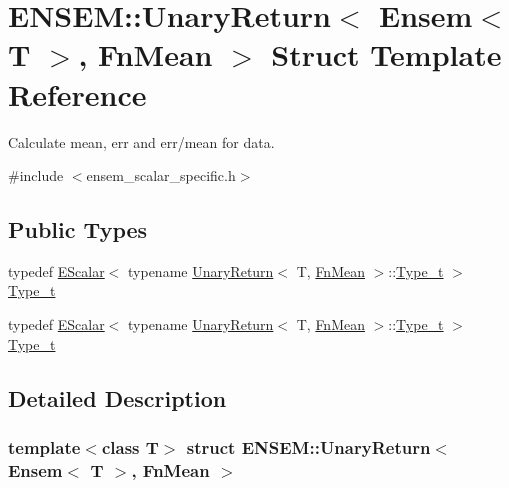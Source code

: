 \hypertarget{structENSEM_1_1UnaryReturn_3_01Ensem_3_01T_01_4_00_01FnMean_01_4}{}\section{E\+N\+S\+EM\+:\+:Unary\+Return$<$ Ensem$<$ T $>$, Fn\+Mean $>$ Struct Template Reference}
\label{structENSEM_1_1UnaryReturn_3_01Ensem_3_01T_01_4_00_01FnMean_01_4}


Calculate mean, err and err/mean for data.  




{\ttfamily \#include $<$ensem\+\_\+scalar\+\_\+specific.\+h$>$}

\subsection*{Public Types}
\begin{DoxyCompactItemize}
\item 
typedef \mbox{\hyperlink{classENSEM_1_1EScalar}{E\+Scalar}}$<$ typename \mbox{\hyperlink{structENSEM_1_1UnaryReturn}{Unary\+Return}}$<$ T, \mbox{\hyperlink{structENSEM_1_1FnMean}{Fn\+Mean}} $>$\+::\mbox{\hyperlink{structENSEM_1_1UnaryReturn_3_01Ensem_3_01T_01_4_00_01FnMean_01_4_aecb00ba039f774eb3f7e9c0d788867a6}{Type\+\_\+t}} $>$ \mbox{\hyperlink{structENSEM_1_1UnaryReturn_3_01Ensem_3_01T_01_4_00_01FnMean_01_4_aecb00ba039f774eb3f7e9c0d788867a6}{Type\+\_\+t}}
\item 
typedef \mbox{\hyperlink{classENSEM_1_1EScalar}{E\+Scalar}}$<$ typename \mbox{\hyperlink{structENSEM_1_1UnaryReturn}{Unary\+Return}}$<$ T, \mbox{\hyperlink{structENSEM_1_1FnMean}{Fn\+Mean}} $>$\+::\mbox{\hyperlink{structENSEM_1_1UnaryReturn_3_01Ensem_3_01T_01_4_00_01FnMean_01_4_aecb00ba039f774eb3f7e9c0d788867a6}{Type\+\_\+t}} $>$ \mbox{\hyperlink{structENSEM_1_1UnaryReturn_3_01Ensem_3_01T_01_4_00_01FnMean_01_4_aecb00ba039f774eb3f7e9c0d788867a6}{Type\+\_\+t}}
\end{DoxyCompactItemize}


\subsection{Detailed Description}
\subsubsection*{template$<$class T$>$\newline
struct E\+N\+S\+E\+M\+::\+Unary\+Return$<$ Ensem$<$ T $>$, Fn\+Mean $>$}

